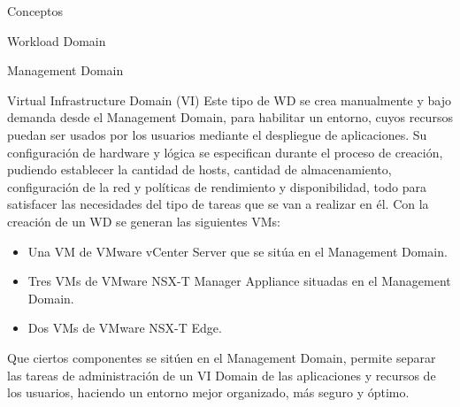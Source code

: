 \begin{section}{Conceptos}
\begin{subsection}{Workload Domain}
\begin{subsubsection}{Management Domain}

\end{subsubsection}

\begin{subsubsection}{Virtual Infrastructure Domain (VI)}
\label{subsubsec:domainVI}
Este tipo de WD se crea manualmente y bajo demanda desde el Management Domain, para habilitar un entorno, cuyos recursos puedan ser usados por los usuarios mediante el despliegue de aplicaciones. Su configuración de hardware y lógica se especifican durante el proceso de creación, pudiendo establecer la cantidad de hosts, cantidad de almacenamiento, configuración de la red y políticas de rendimiento y disponibilidad, todo para satisfacer las necesidades del tipo de tareas que se van a realizar en él. Con la creación de un WD se generan las siguientes VMs:
\begin{itemize}
  \item Una VM de VMware vCenter Server que se sitúa en el Management Domain.
  \item Tres VMs de VMware NSX-T Manager Appliance situadas en el Management Domain.
  \item Dos VMs de VMware NSX-T Edge.
\end{itemize}
Que ciertos componentes se sitúen en el Management Domain, permite separar las tareas de administración de un VI Domain de las aplicaciones y recursos de los usuarios, haciendo un entorno mejor organizado, más seguro y óptimo.


\end{subsubsection}
\end{subsection}
\end{section}
